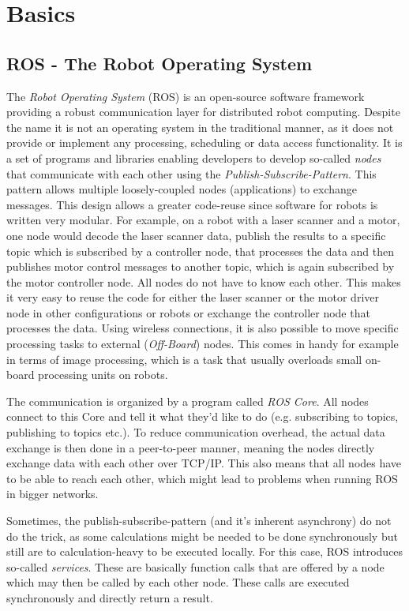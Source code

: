 \chapter{Basics}
\label{chap:basics}
\section{ROS - The Robot Operating System}

The \textit{Robot Operating System} (ROS) is an open-source software framework providing a robust communication layer for distributed robot computing\cite{ros:intro}. Despite the name it is not an operating system in the traditional manner, as it does not provide or implement any processing, scheduling or data access functionality. It is a set of programs and libraries enabling developers to develop so-called \textit{nodes} that communicate with each other using the \textit{Publish-Subscribe-Pattern}. %
This pattern allows multiple loosely-coupled nodes (applications) to exchange messages. This design allows a greater code-reuse since software for robots is written very modular. For example, on a robot with a laser scanner and a motor, one node would decode the laser scanner data, publish the results to a specific topic which is subscribed by a controller node, that processes the data and then publishes motor control messages to another topic, which is again subscribed by the motor controller node. All nodes do not have to know each other. This makes it very easy to reuse the code for either the laser scanner or the motor driver node in other configurations or robots or exchange the controller node that processes the data. Using wireless connections, it is also possible to move specific processing tasks to external (\textit{Off-Board}) nodes. This comes in handy for example in terms of image processing, which is a task that usually overloads small on-board processing units on robots.

The communication is organized by a program called \textit{ROS Core}. All nodes connect to this Core and tell it what they'd like to do (e.g. subscribing to topics, publishing to topics etc.). To reduce communication overhead, the actual data exchange is then done in a peer-to-peer manner, meaning the nodes directly exchange data with each other over TCP/IP. This also means that all nodes have to be able to reach each other, which might lead to problems when running ROS in bigger networks.

Sometimes, the publish-subscribe-pattern (and it's inherent asynchrony) do not do the trick, as some calculations might be needed to be done synchronously but still are to calculation-heavy to be executed locally. For this case, ROS introduces so-called \textit{services}. These are basically function calls that are offered by a node which may then be called by each other node. These calls are executed synchronously and directly return a result.

